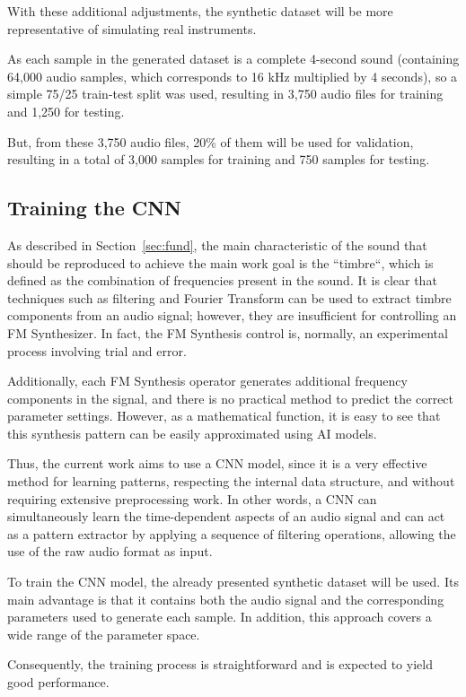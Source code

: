 \documentclass[sigconf,natbib=false]{acmart}
\begin{document}
With these additional adjustments, the synthetic dataset will be more representative of simulating real instruments.

As each sample in the generated dataset is a complete 4-second sound (containing 64,000 audio samples, which corresponds to 16 kHz multiplied by 4 seconds), so a simple 75/25 train-test split was used, resulting in 3,750 audio files for training and 1,250 for testing.

But, from these 3,750 audio files, 20\% of them will be used for validation, resulting in a total of 3,000 samples for training and 750 samples for testing.

\subsection{Training the CNN}

As described in Section~\ref{sec:fund}, the main characteristic of the sound that should be reproduced to achieve the main work goal is the ``timbre``, which is defined as the combination of frequencies present in the sound. It is clear that techniques such as filtering and Fourier Transform can be used to extract timbre components from an audio signal; however, they are insufficient for controlling an FM Synthesizer. In fact, the FM Synthesis control is, normally, an experimental process involving trial and error.

Additionally, each FM Synthesis operator generates additional frequency components in the signal, and there is no practical method to predict the correct parameter settings. However, as a mathematical function, it is easy to see that this synthesis pattern can be easily approximated using AI models.

Thus, the current work aims to use a CNN model, since it is a very effective method for learning patterns, respecting the internal data structure, and without requiring extensive preprocessing work. In other words, a CNN can simultaneously learn the time-dependent aspects of an audio signal and can act as a pattern extractor by applying a sequence of filtering operations, allowing the use of the raw audio format as input.

To train the CNN model, the already presented synthetic dataset will be used. Its main advantage is that it contains both the audio signal and the corresponding parameters used to generate each sample. In addition, this approach covers a wide range of the parameter space.

Consequently, the training process is straightforward and is expected to yield good performance.
\end{document}
